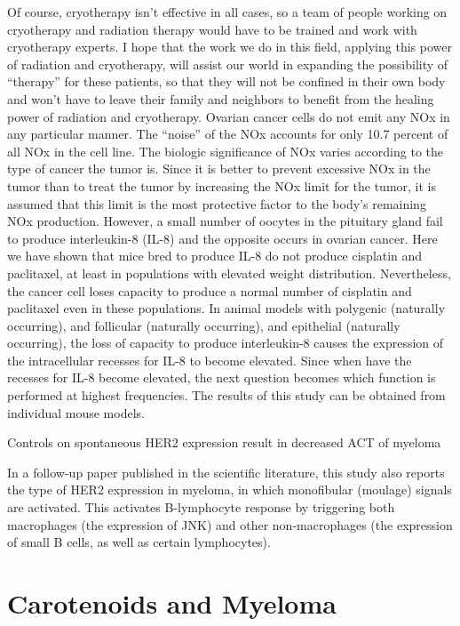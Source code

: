 \documentclass{article}
\begin{document}
Of course, cryotherapy isn’t effective in all cases, so a team of people working on cryotherapy and radiation therapy would have to be trained and work with cryotherapy experts. I hope that the work we do in this field, applying this power of radiation and cryotherapy, will assist our world in expanding the possibility of “therapy” for these patients, so that they will not be confined in their own body and won’t have to leave their family and neighbors to benefit from the healing power of radiation and cryotherapy. Ovarian cancer cells do not emit any NOx in any particular manner. The “noise” of the NOx accounts for only 10.7 percent of all NOx in the cell line. The biologic significance of NOx varies according to the type of cancer the tumor is. Since it is better to prevent excessive NOx in the tumor than to treat the tumor by increasing the NOx limit for the tumor, it is assumed that this limit is the most protective factor to the body’s remaining NOx production. However, a small number of oocytes in the pituitary gland fail to produce interleukin-8 (IL-8) and the opposite occurs in ovarian cancer. Here we have shown that mice bred to produce IL-8 do not produce cisplatin and paclitaxel, at least in populations with elevated weight distribution. Nevertheless, the cancer cell loses capacity to produce a normal number of cisplatin and paclitaxel even in these populations. In animal models with polygenic (naturally occurring), and follicular (naturally occurring), and epithelial (naturally occurring), the loss of capacity to produce interleukin-8 causes the expression of the intracellular recesses for IL-8 to become elevated. Since when have the recesses for IL-8 become elevated, the next question becomes which function is performed at highest frequencies. The results of this study can be obtained from individual mouse models.

Controls on spontaneous HER2 expression result in decreased ACT of myeloma

In a follow-up paper published in the scientific literature, this study also reports the type of HER2 expression in myeloma, in which monofibular (moulage) signals are activated. This activates B-lymphocyte response by triggering both macrophages (the expression of JNK) and other non-macrophages (the expression of small B cells, as well as certain lymphocytes).



\section{Carotenoids and Myeloma}
\end{document}
